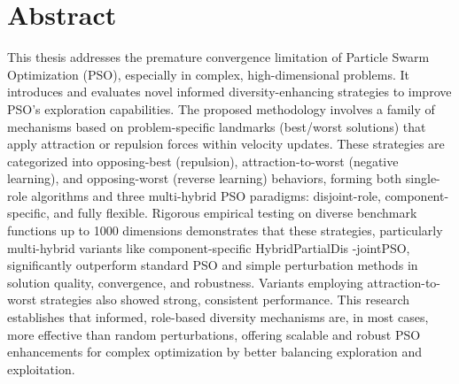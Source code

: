 \thispagestyle{plain}
%
%
%

\chapter*{Abstract}


This thesis addresses the premature convergence limitation of Particle Swarm Optimization (PSO), especially in complex, high-dimensional problems. It introduces and evaluates novel informed diversity-enhancing strategies to improve PSO's exploration capabilities. The proposed methodology involves a family of mechanisms based on problem-specific landmarks (best/worst solutions) that apply attraction or repulsion forces within velocity updates. These strategies are categorized into opposing-best (repulsion), attraction-to-worst (negative learning), and opposing-worst (reverse learning) behaviors, forming both single-role algorithms and three multi-hybrid PSO par\-a\-digms: disjoint-role, component-specific, and fully flexible. Rigorous empirical testing on diverse benchmark functions up to 1000 dimensions demonstrates that these strategies, particularly multi-hybrid variants like component-specific Hy\-brid\-Par\-tial\-Dis
-jointPSO, significantly outperform standard PSO and simple perturbation methods in solution quality, convergence, and robustness. Variants employing attraction-to-worst strategies also showed strong, consistent performance. This research establishes that informed, role-based diversity mechanisms are, in most cases, more effective than random perturbations, offering scalable and robust PSO enhancements for complex optimization by better balancing exploration and exploitation.







\MediaOptionLogicBlank